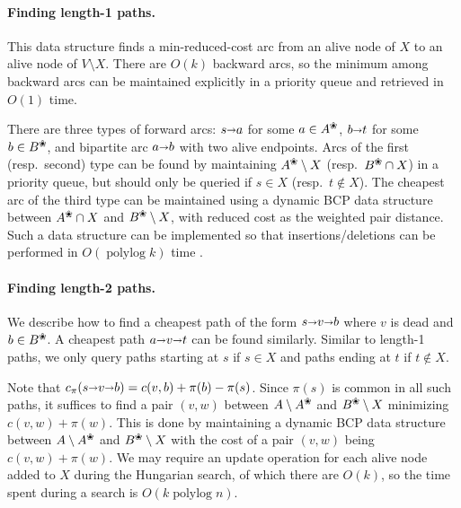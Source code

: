 \documentclass[11pt]{article}
\def\polylog{\mathop{\mathrm{polylog}}}
\def\arcto{\mathord\shortrightarrow}
\def\arc#1#2{#1\arcto#2}
\def\alive#1{{#1}^\text{\ding{96}}}
\def\dead#1{{#1} \setminus \alive{#1}}
\theoremstyle{plain}
\numberwithin{figure}{section}
\begin{document}
\paragraph*{Finding length-1 paths.}
This data structure finds a min-reduced-cost arc from an alive node of
$X$ to an alive node of $V \setminus X$.
There are $O(k)$ backward arcs, so the minimum among backward arcs can be
maintained explicitly in a priority queue and retrieved in $O(1)$ time.

There are three types of forward arcs: $\arc sa$ for some $a \in \alive{A}$,
$\arc bt$ for some $b \in \alive{B}$, and bipartite arc $\arc ab$ with two
alive endpoints.
Arcs of the first (resp.\ second) type can be found by maintaining
$\alive{A} \setminus X$ (resp.\ $\alive{B} \cap X$) in a priority queue,
but should only be queried if $s \in X$ (resp.\ $t \not\in X$).
%
The cheapest arc of the third type can be maintained using a dynamic
BCP data structure between $\alive{A} \cap X$ and $\alive{B} \setminus X$,
with reduced cost as the weighted pair distance.
Such a data structure can be implemented so that insertions/deletions can be
performed in $O(\polylog k)$ time \cite{KMRSS17}.

\paragraph*{Finding length-2 paths.}
We describe how to find a cheapest path of the form $s \arcto v \arcto b$ where
$v$ is dead and $b \in \alive{B}$.
A cheapest path $a \arcto v \arcto t$ can be found similarly.
Similar to length-1 paths, we only query paths starting at $s$ if $s \in X$
and paths ending at $t$ if $t \not\in X$.

Note that $c_\pi(s \arcto v \arcto b) = c(v, b) + \pi(b) - \pi(s)$.
Since $\pi(s)$ is common in all such paths, it suffices to find a pair $(v,w)$ between
$\dead{A}$ and $\alive{B} \setminus X$ minimizing $c(v, w) + \pi(w)$.
This is done by maintaining a dynamic BCP data structure between
$\dead{A}$ and $\alive{B} \setminus X$ with
the cost of a pair $(v, w)$ being $c(v, w) + \pi(w)$.
We may require an update operation for each alive node added to $X$ during the
Hungarian search, of which there are $O(k)$, so the time spent during a search
is $O(k\polylog n)$.
\end{document}
